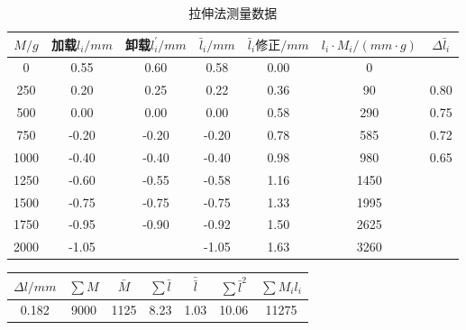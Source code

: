 \documentclass[11pt]{article}
\begin{document}
\begin{table}[H]
    \centering
    \caption{拉伸法测量数据}
    \begin{tabular}{|c|c|c|c|c|c|c|}
    \hline
        $M/g$ & 加载$l_i/mm$ & 卸载$l_i^'/mm$ & $\bar{l}_i/mm$ & $\bar{l}_i\text{修正}/mm$ & $l_i\cdot M_i/(mm\cdot g)$ & $\Delta \bar{l}_i$ \\ \hline
        0 & 0.55 & 0.60  & 0.58  & 0.00  & 0 & ~   \\ \hline
        250 & 0.20  & 0.25  & 0.22  & 0.36  & 90 & 0.80  \\ \hline
        500 & 0.00  & 0.00  & 0.00  & 0.58  & 290 & 0.75 \\ \hline
        750 & -0.20  & -0.20  & -0.20  & 0.78  & 585 & 0.72  \\ \hline
        1000 & -0.40  & -0.40  & -0.40  & 0.98  & 980 & 0.65 \\ \hline
        1250 & -0.60  & -0.55  & -0.58  & 1.16  & 1450 & ~ \\ \hline
        1500 & -0.75  & -0.75  & -0.75  & 1.33  & 1995 & ~ \\ \hline
        1750 & -0.95  & -0.90  & -0.92  & 1.50  & 2625 & ~  \\ \hline
        2000 & -1.05  & ~ & -1.05  & 1.63  & 3260 & ~  \\ \hline
    \end{tabular}
\end{table}

\begin{table}[H]
    \centering
    \begin{tabular}{|c|c|c|c|c|c|c|}
    \hline
        $\Delta l/mm$  & $\sum M$ & $\bar{M}$  & $\sum \bar{l}$ & $\bar{\bar{l}}$  & $\sum \bar{l}^2$ & $\sum M_i l_i$ \\ \hline
        0.182 & 9000 & 1125 & 8.23 & 1.03 & 10.06 & 11275  \\ \hline
    \end{tabular}
\end{table}
\end{document}
